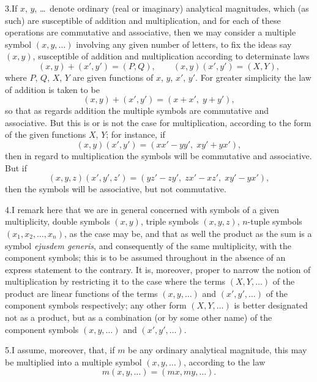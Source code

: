 \documentclass[11pt]{article}
\begin{document}
3.\quad If $x$, $y$, \ldots\ denote ordinary (real or imaginary) analytical magnitudes, which (as such) are susceptible of addition and multiplication, and for each of these operations are commutative and associative, then we may consider a multiple symbol $(x, y, \ldots)$ involving any given number of letters, to fix the ideas say $(x, y)$, susceptible of addition and multiplication according to determinate laws
\[
(x, y) + (x', y') = (P, Q),\qquad (x, y)(x', y') = (X, Y),
\]
where $P$, $Q$, $X$, $Y$ are given functions of $x$, $y$, $x'$, $y'$. For greater simplicity the law of addition is taken to be
\[
(x, y) + (x', y') = (x + x',\; y + y'),
\]
so that as regards addition the multiple symbols are commutative and associative. But this is or is not the case for multiplication, according to the form of the given functions $X$, $Y$; for instance, if
\[
(x, y)(x', y') = (xx' - yy',\; xy' + yx'),
\]
then in regard to multiplication the symbols will be commutative and associative. But if
\[
(x, y, z)(x', y', z') = (yz' - zy',\; zx' - xz',\; xy' - yx'),
\]
then the symbols will be associative, but not commutative.

4.\quad I remark here that we are in general concerned with symbols of a given multiplicity, double symbols $(x, y)$, triple symbols $(x, y, z)$, $n$-tuple symbols $(x_{1}, x_{2}, \ldots, x_{n})$, as the case may be, and that as well the product as the sum is a symbol \textit{ejusdem generis}, and consequently of the same multiplicity, with the component symbols; this is to be assumed throughout in the absence of an express statement to the contrary. It is, moreover, proper to narrow the notion of multiplication by restricting it to the case where the terms $(X, Y, \ldots)$ of the product are linear functions of the terms $(x, y, \ldots)$ and $(x', y', \ldots)$ of the component symbols respectively; any other form $(X, Y, \ldots)$ is better designated not as a product, but as a combination (or by some other name) of the component symbols $(x, y, \ldots)$ and $(x', y', \ldots)$.

5.\quad I assume, moreover, that, if $m$ be any ordinary analytical magnitude, this may be multiplied into a multiple symbol $(x, y, \ldots)$, according to the law
\[
m(x, y, \ldots) = (mx, my, \ldots).
\]
\end{document}
